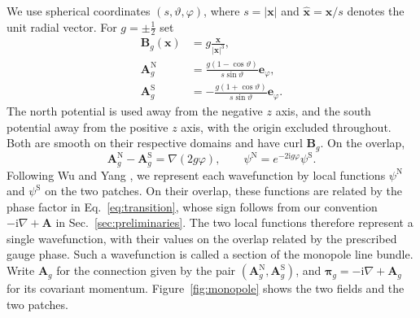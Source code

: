 \documentclass[11pt,a4paper]{article}
\theoremstyle{remark}
\theoremstyle{plain}
\newcommand{\A}{\mathbf A}
\newcommand{\B}{\mathbf B}
\newcommand{\bpi}{\boldsymbol\pi}
\begin{document}
We use spherical coordinates $(s,\vartheta,\varphi)$,
where $s=|\mathbf x|$ and
$\widehat{\mathbf x}=\mathbf x/s$ denotes the unit radial vector.
For $g=\pm\tfrac12$ set
\begin{equation}
 \begin{aligned}
 \B_g(\mathbf x)&=g\frac{\mathbf x}{|\mathbf x|^3},\\
 \A_g^{\mathrm N}&=\frac{g(1-\cos\vartheta)}{s\sin\vartheta}\mathbf e_\varphi,\\
 \A_g^{\mathrm S}&=-\frac{g(1+\cos\vartheta)}{s\sin\vartheta}\mathbf e_\varphi.
 \end{aligned}
 \label{eq:monopole-gauges}
\end{equation}
The north potential is used away from the negative $z$ axis, and the
south potential away from the positive $z$ axis, with the origin
excluded throughout. Both are smooth on their respective domains
and have curl $\B_g$. On the overlap,
\begin{equation}
 \A_g^{\mathrm N}-\A_g^{\mathrm S}=\nabla(2g\varphi),\qquad
 \psi^{\mathrm N}=e^{-2\mathrm{i}g\varphi}\psi^{\mathrm S}.
 \label{eq:transition}
\end{equation}
Following Wu and Yang \cite{WuYang1976}, we represent each wavefunction
by local functions $\psi^{\mathrm N}$ and $\psi^{\mathrm S}$ on the two
patches. On their overlap, these functions are related by the phase
factor in Eq.~\eqref{eq:transition}, whose sign follows from our
convention $-\mathrm{i}\nabla+\A$ in Sec.~\ref{sec:preliminaries}.
The two local functions therefore represent a single wavefunction,
with their values on the overlap related by the prescribed gauge
phase. Such a wavefunction is called a section of the monopole
line bundle. Write $\A_g$ for the connection
given by the pair $(\A_g^{\mathrm N},\A_g^{\mathrm S})$, and $\bpi_g=-\mathrm{i}\nabla+\A_g$ for its
covariant momentum. Figure~\ref{fig:monopole} shows the two fields and
the two patches.
\end{document}
